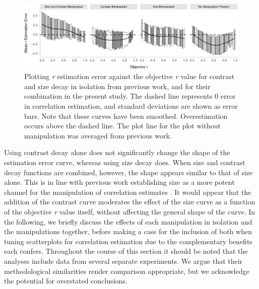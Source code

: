 \documentclass[manuscript, review, anonymous, screen]{acmart}
\begin{document}
\begin{figure}

{\centering \includegraphics[width=1\textwidth,height=\textheight]{size_and_contrast_files/figure-pdf/fig-est-multi-exp-1.pdf}

}

\caption{\label{fig-est-multi-exp}Plotting \emph{r} estimation error
against the objective \emph{r} value for contrast and size decay in
isolation from previous work, and for their combination in the present
study. The dashed line represents 0 error in correlation estimation, and
standard deviations are shown as error bars. Note that these curves have
been smoothed. Overestimation occurs above the dashed line. The plot
line for the plot without manipulation was averaged from previous work.}

\end{figure}

Using contrast decay alone does not significantly change the shape of
the estimation error curve, whereas using size decay does. When size and
contrast decay functions are combined, however, the shape appears
similar to that of size alone. This is in line with previous work
establishing size as a more potent channel for the manipulation of
correlation estimates \citep{strain_2023b}. It would appear that the
addition of the contrast curve moderates the effect of the size curve as
a function of the objective \emph{r} value itself, without affecting the
general shape of the curve. In the following, we briefly discuss the
effects of each manipulation in isolation and the manipulations
together, before making a case for the inclusion of both when tuning
scatterplots for correlation estimation due to the complementary
benefits each confers. Throughout the course of this section it should
be noted that the analyses include data from several separate
experiments. We argue that their methodological similarities render
comparison appropriate, but we acknowledge the potential for overstated
conclusions.
\end{document}
